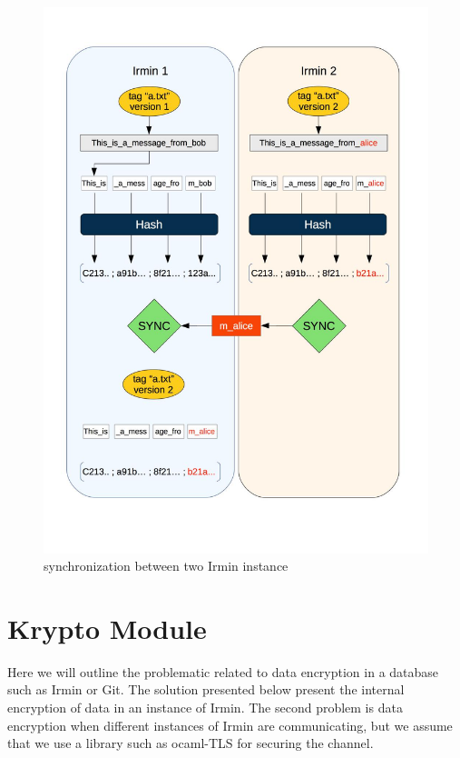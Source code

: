 \documentclass[10pt,a4paper]{report}
\begin{document}
\begin{figure}[H]
\centerline{\includegraphics[scale=0.35]{img/optimization-sync-blob.jpg}}
\caption{synchronization between two Irmin instance}
\end{figure}


\chapter{Krypto Module}
Here we will outline the problematic related to data encryption in a database such as Irmin or Git. 
The solution presented below present the internal encryption of data in an instance of Irmin.
The second problem is data encryption when different instances of Irmin are communicating, but we assume that we use a library such as ocaml-TLS for securing the channel.\newline
\end{document}

